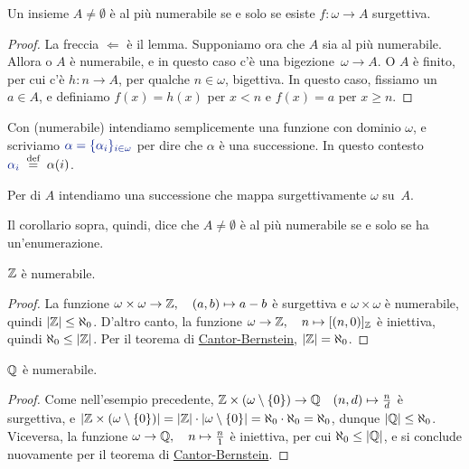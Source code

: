\begin{corollary}
	\label{disugcardnum}
	Un insieme $A \ne \emptyset$ \`e al pi\`u numerabile se e solo se
esiste $f \colon \omega \to A$ surgettiva.
\end{corollary}

\begin{proof}
	La freccia $\Leftarrow$ \`e il lemma. Supponiamo ora che $A$ sia
al pi\`u numerabile. Allora o $A$ \`e numerabile, e in questo caso
c'\`e una bigezione~$\omega\to A$. O $A$ \`e finito, per cui c'\`e $h\colon
n \to A$, per qualche $n\in\omega$, bigettiva. In questo caso, fissiamo un $a\in A$, e
definiamo $f(x) = h(x)$ per $x<n$ e $f(x)=a$ per $x\ge n$.
\end{proof}

\begin{notation}
	Con  (numerabile) intendiamo semplicemente una
funzione con dominio $\omega$, e scriviamo $\drkblu \alpha =
\{\alpha_i\}_{i \in \omega}$ per dire che $\alpha$ \`e una successione. In
questo contesto ${\drkblu \alpha_i} \;\Mydef\; \alpha(i)$.

Per  di $A$
	intendiamo una successione che mappa surgettivamente $\omega$
su~$A$.
\end{notation}

{\drkgrn Il corollario sopra, quindi, dice che $A \ne \emptyset$ \`e al pi\`u numerabile se e solo se ha un'enumerazione.}

\begin{example}
	$\mathbb Z$ \`e numerabile.
\end{example}

\begin{proof}
	La funzione $\omega \times \omega \to \mathbb Z,\quad (a,b) \mapsto a - b$ \`e surgettiva
e $\omega \times \omega$ \`e numerabile, quindi $|\mathbb Z|\leq \aleph_0$.
	D'altro canto, la funzione $\omega \rightarrow \mathbb Z,\quad n \mapsto
[(n,0)]_\mathbb Z$ \`e iniettiva, quindi $\aleph_0 \leq |\mathbb Z|$. Per
il teorema di \hyperref[CB]{Cantor-Bernstein}, $|\mathbb Z| = \aleph_0$.
\end{proof}

\begin{example}
	$\mathbb Q$ \`e numerabile.
\end{example}

\begin{proof}
	Come nell'esempio precedente, $\mathbb Z \times (\omega \setminus\{0\})
\rightarrow \mathbb Q\quad  (n,d) \mapsto \frac{n}{d}$ \`e surgettiva, e $|\mathbb Z
\times (\omega \setminus\{0\})| = |\mathbb Z| \cdot |\omega \setminus\{0\}| =
\aleph_0 \cdot \aleph_0 = \aleph_0$, dunque $|\mathbb Q|\leq \aleph_0$.
	Viceversa, la funzione $\omega \rightarrow \mathbb Q,\quad n \mapsto
\frac{n}{1}$ \`e iniettiva, per cui $\aleph_0 \leq |\mathbb Q|$, e si conclude
nuovamente per il teorema di \hyperref[CB]{Cantor-Bernstein}.
\end{proof}


